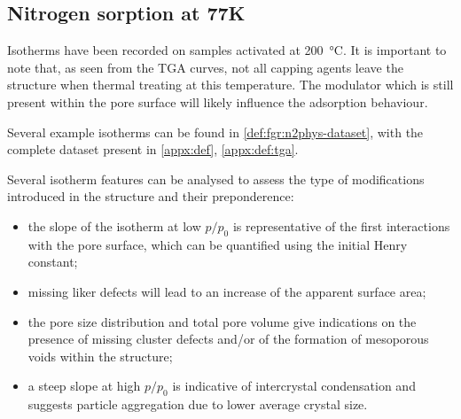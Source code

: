 
\subsection{Nitrogen sorption at 77K}

Isotherms have been recorded on samples activated at 
\SI{200}{\degreeCelsius}.
It is important to note that, as seen from the TGA curves,
not all capping agents leave the structure when thermal treating 
at this temperature. The modulator which is still present 
within the pore surface will likely influence the adsorption
behaviour.

Several example isotherms can be found in 
\autoref{def:fgr:n2phys-dataset}, with the complete dataset 
present in \autoref{appx:def}, \autoref{appx:def:tga}.

Several isotherm features can be analysed to assess the 
type of modifications introduced in the structure and their
preponderence:

\begin{itemize}
    \item the slope of the isotherm at low \(p/p_0\) is representative
    of the first interactions with the pore surface, which can be
    quantified using the initial Henry constant;
    \item missing liker defects will lead to an increase of the 
    apparent surface area;
    \item the pore size distribution and total pore volume give 
    indications on the presence of missing cluster defects and/or
    of the formation of mesoporous voids within the structure;
    \item a steep slope at high \(p/p_0\) is indicative of intercrystal
    condensation and suggests particle aggregation due to lower average 
    crystal size.
\end{itemize}

